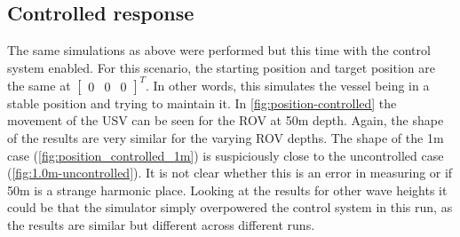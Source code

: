 \documentclass[class=article, crop=false]{standalone}
\begin{document}
\subsection{Controlled response}
The same simulations as above were performed but this time with the control system enabled. For this scenario, the starting position and target position are the same at \(\begin{bmatrix} 0 & 0 & 0 \end{bmatrix}^T\). In other words, this simulates the vessel being in a stable position and trying to maintain it. In \cref{fig:position-controlled} the movement of the USV can be seen for the ROV at 50m depth. Again, the shape of the results are very similar for the varying ROV depths. The shape of the 1m case (\cref{fig:position_controlled_1m}) is suspiciously close to the uncontrolled case (\cref{fig:1.0m-uncontrolled}). It is not clear whether this is an error in measuring or if 50m is a strange harmonic place. Looking at the results for other wave heights it could be that the simulator simply overpowered the control system in this run, as the results are similar but different across different runs.
\end{document}
